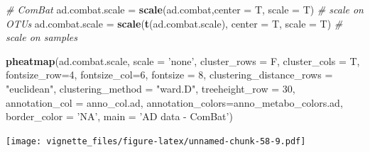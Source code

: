 \documentclass[]{book}
\newenvironment{Shaded}{\begin{snugshade}}{\end{snugshade}}
\newcommand{\KeywordTok}[1]{\textcolor[rgb]{0.13,0.29,0.53}{\textbf{#1}}}
\newcommand{\DataTypeTok}[1]{\textcolor[rgb]{0.13,0.29,0.53}{#1}}
\newcommand{\DecValTok}[1]{\textcolor[rgb]{0.00,0.00,0.81}{#1}}
\newcommand{\StringTok}[1]{\textcolor[rgb]{0.31,0.60,0.02}{#1}}
\newcommand{\CommentTok}[1]{\textcolor[rgb]{0.56,0.35,0.01}{\textit{#1}}}
\newcommand{\NormalTok}[1]{#1}
\begin{document}
\begin{Shaded}
\begin{Highlighting}[]
\CommentTok{# ComBat}
\NormalTok{ad.combat.scale =}\StringTok{ }\KeywordTok{scale}\NormalTok{(ad.combat,}\DataTypeTok{center =}\NormalTok{ T, }\DataTypeTok{scale =}\NormalTok{ T) }\CommentTok{# scale on OTUs}
\NormalTok{ad.combat.scale =}\StringTok{ }\KeywordTok{scale}\NormalTok{(}\KeywordTok{t}\NormalTok{(ad.combat.scale), }\DataTypeTok{center =}\NormalTok{ T, }\DataTypeTok{scale =}\NormalTok{ T) }\CommentTok{# scale on samples}

\KeywordTok{pheatmap}\NormalTok{(ad.combat.scale, }
         \DataTypeTok{scale =} \StringTok{'none'}\NormalTok{, }
         \DataTypeTok{cluster_rows =}\NormalTok{ F, }
         \DataTypeTok{cluster_cols =}\NormalTok{ T, }
         \DataTypeTok{fontsize_row=}\DecValTok{4}\NormalTok{, }\DataTypeTok{fontsize_col=}\DecValTok{6}\NormalTok{,}
         \DataTypeTok{fontsize =} \DecValTok{8}\NormalTok{,}
         \DataTypeTok{clustering_distance_rows =} \StringTok{"euclidean"}\NormalTok{,}
         \DataTypeTok{clustering_method =} \StringTok{"ward.D"}\NormalTok{,}
         \DataTypeTok{treeheight_row =} \DecValTok{30}\NormalTok{,}
         \DataTypeTok{annotation_col =}\NormalTok{ anno_col.ad,}
         \DataTypeTok{annotation_colors=}\NormalTok{anno_metabo_colors.ad,}
         \DataTypeTok{border_color =} \StringTok{'NA'}\NormalTok{,}
         \DataTypeTok{main =} \StringTok{'AD data - ComBat'}\NormalTok{)}
\end{Highlighting}
\end{Shaded}

\texttt{[image: vignette\_files/figure-latex/unnamed-chunk-58-9.pdf]}
\end{document}

